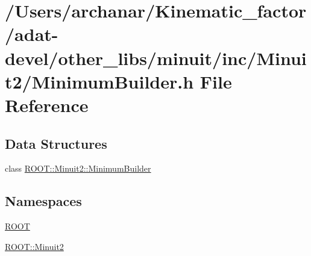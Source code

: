 \hypertarget{adat-devel_2other__libs_2minuit_2inc_2Minuit2_2MinimumBuilder_8h}{}\section{/\+Users/archanar/\+Kinematic\+\_\+factor/adat-\/devel/other\+\_\+libs/minuit/inc/\+Minuit2/\+Minimum\+Builder.h File Reference}
\label{adat-devel_2other__libs_2minuit_2inc_2Minuit2_2MinimumBuilder_8h}
\subsection*{Data Structures}
\begin{DoxyCompactItemize}
\item 
class \mbox{\hyperlink{classROOT_1_1Minuit2_1_1MinimumBuilder}{R\+O\+O\+T\+::\+Minuit2\+::\+Minimum\+Builder}}
\end{DoxyCompactItemize}
\subsection*{Namespaces}
\begin{DoxyCompactItemize}
\item 
 \mbox{\hyperlink{namespaceROOT}{R\+O\+OT}}
\item 
 \mbox{\hyperlink{namespaceROOT_1_1Minuit2}{R\+O\+O\+T\+::\+Minuit2}}
\end{DoxyCompactItemize}
